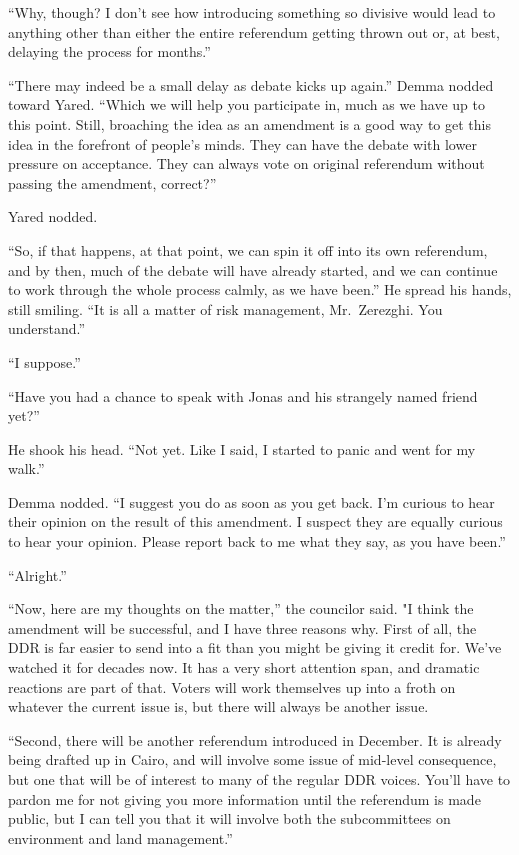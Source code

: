 ``Why, though? I don't see how introducing something so divisive would lead to anything other than either the entire referendum getting thrown out or, at best, delaying the process for months.''

``There may indeed be a small delay as debate kicks up again.'' Demma nodded toward Yared. ``Which we will help you participate in, much as we have up to this point. Still, broaching the idea as an amendment is a good way to get this idea in the forefront of people's minds. They can have the debate with lower pressure on acceptance. They can always vote on original referendum without passing the amendment, correct?''

Yared nodded.

``So, if that happens, at that point, we can spin it off into its own referendum, and by then, much of the debate will have already started, and we can continue to work through the whole process calmly, as we have been.'' He spread his hands, still smiling. ``It is all a matter of risk management, Mr.~Zerezghi. You understand.''

``I suppose.''

``Have you had a chance to speak with Jonas and his strangely named friend yet?''

He shook his head. ``Not yet. Like I said, I started to panic and went for my walk.''

Demma nodded. ``I suggest you do as soon as you get back. I'm curious to hear their opinion on the result of this amendment. I suspect they are equally curious to hear your opinion. Please report back to me what they say, as you have been.''

``Alright.''

``Now, here are my thoughts on the matter,'' the councilor said. "I think the amendment will be successful, and I have three reasons why. First of all, the DDR is far easier to send into a fit than you might be giving it credit for. We've watched it for decades now. It has a very short attention span, and dramatic reactions are part of that. Voters will work themselves up into a froth on whatever the current issue is, but there will always be another issue.

``Second, there will be another referendum introduced in December. It is already being drafted up in Cairo, and will involve some issue of mid-level consequence, but one that will be of interest to many of the regular DDR voices. You'll have to pardon me for not giving you more information until the referendum is made public, but I can tell you that it will involve both the subcommittees on environment and land management.''

